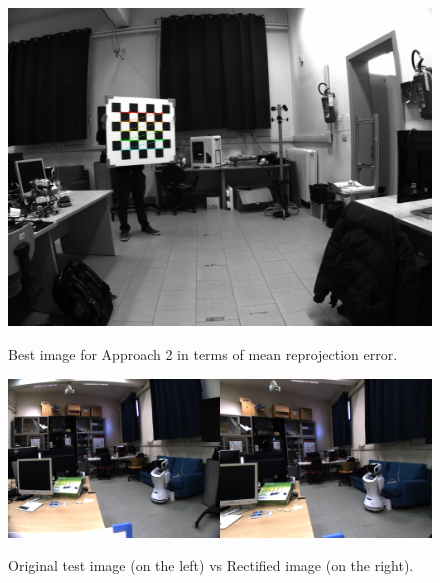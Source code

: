 \documentclass{article}
\begin{document}
\begin{figure}[h]
\begin{center} 
  \includegraphics[scale=0.17]{chessboard38}\\ 
  \caption{\footnotesize{Best image for Approach 2 in terms of mean reprojection error.}}
  \label{chess::best} 
\end{center} 
\end{figure}
\begin{figure}[h] 
\begin{center} 
  \includegraphics[scale=0.35]{comparison1}\\ 
  \caption{\footnotesize{Original test image (on the left) vs Rectified image (on the right).}}
  \label{originVSrect} 
\end{center} 
\end{figure}
\end{document}
